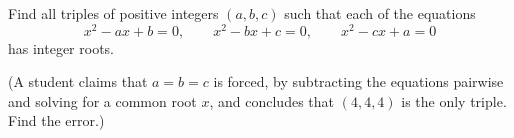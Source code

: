 Find all triples of positive integers $(a,b,c)$ such that each of the equations
\[
x^2-ax+b=0,\qquad x^2-bx+c=0,\qquad x^2-cx+a=0
\]
has integer roots.

(A student claims that $a=b=c$ is forced, by subtracting the equations pairwise and solving for a common root $x$, and concludes that $(4,4,4)$ is the only triple. Find the error.)
